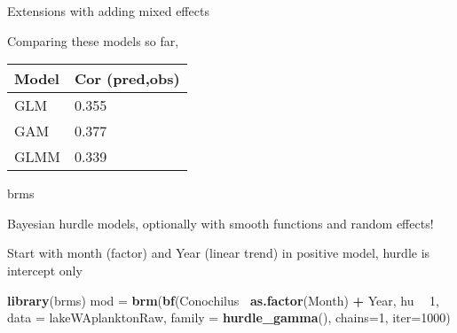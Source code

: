 \documentclass[ignorenonframetext,]{beamer}
\newenvironment{Shaded}{\begin{snugshade}}{\end{snugshade}}
\newcommand{\DataTypeTok}[1]{\textcolor[rgb]{0.13,0.29,0.53}{#1}}
\newcommand{\DecValTok}[1]{\textcolor[rgb]{0.00,0.00,0.81}{#1}}
\newcommand{\KeywordTok}[1]{\textcolor[rgb]{0.13,0.29,0.53}{\textbf{#1}}}
\newcommand{\NormalTok}[1]{#1}
\newcommand{\OperatorTok}[1]{\textcolor[rgb]{0.81,0.36,0.00}{\textbf{#1}}}
\newcommand{\StringTok}[1]{\textcolor[rgb]{0.31,0.60,0.02}{#1}}
\begin{document}
\begin{frame}{Extensions with adding mixed effects}
\protect\hypertarget{extensions-with-adding-mixed-effects-1}{}

Comparing these models so far,

\begin{tabular}{l|l}
\hline
Model & Cor (pred,obs)\\
\hline
GLM & 0.355\\
\hline
GAM & 0.377\\
\hline
GLMM & 0.339\\
\hline
\end{tabular}

\end{frame}

\begin{frame}[fragile]{brms}
\protect\hypertarget{brms}{}

Bayesian hurdle models, optionally with smooth functions and random
effects!

Start with month (factor) and Year (linear trend) in positive model,
hurdle is intercept only

\begin{Shaded}
\begin{Highlighting}[]
\KeywordTok{library}\NormalTok{(brms)}
\NormalTok{mod =}\StringTok{ }\KeywordTok{brm}\NormalTok{(}\KeywordTok{bf}\NormalTok{(Conochilus}\OperatorTok{~}\StringTok{ }\KeywordTok{as.factor}\NormalTok{(Month) }\OperatorTok{+}\StringTok{ }\NormalTok{Year, }
\NormalTok{       hu }\OperatorTok{~}\StringTok{ }\DecValTok{1}\NormalTok{, }
      \DataTypeTok{data =}\NormalTok{ lakeWAplanktonRaw, }\DataTypeTok{family =} \KeywordTok{hurdle_gamma}\NormalTok{(), }
        \DataTypeTok{chains=}\DecValTok{1}\NormalTok{, }\DataTypeTok{iter=}\DecValTok{1000}\NormalTok{)}
\end{Highlighting}
\end{Shaded}

\end{frame}
\end{document}
